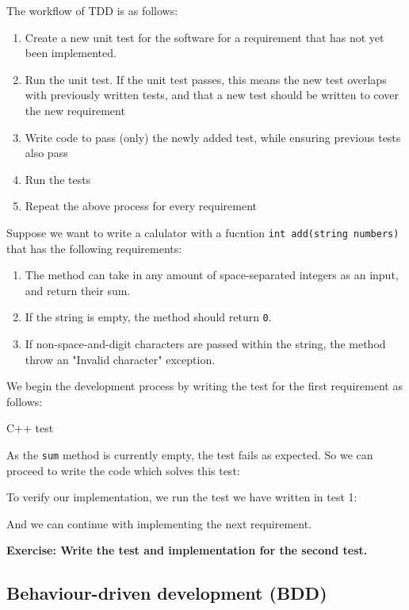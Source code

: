 The workflow of TDD is as follows:

\begin{enumerate}
	\item Create a new unit test for the software for a requirement that has not yet been implemented. 
	\item Run the unit test. If the unit test passes, this means the new test overlaps with previously written tests, and that a new test should be written to cover the new requirement
	\item Write code to pass (only) the newly added test, while ensuring previous tests also pass
	\item Run the tests
	\item Repeat the above process for every requirement
\end{enumerate}

Suppose we want to write a calulator with a fucntion \texttt{int add(string numbers)} that has the following requirements:

\begin{enumerate}
	\item The method can take in any amount of space-separated integers as an input, and return their sum.
	\item If the string is empty, the method should return \texttt{0}.
	\item If non-space-and-digit characters are passed within the string, the method throw an "Invalid character" exception. 
\end{enumerate}

We begin the development process by writing the test for the first requirement as follows:

\rem C++ test

As the \texttt{sum} method is currently empty, the test fails as expected. So we can proceed to write the code which solves this test:


To verify our implementation, we run the test we have written in test 1:


And we can continue with implementing the next requirement. 

\textbf{Exercise: Write the test and implementation for the second test.}

\subsection{Behaviour-driven development (BDD)}

